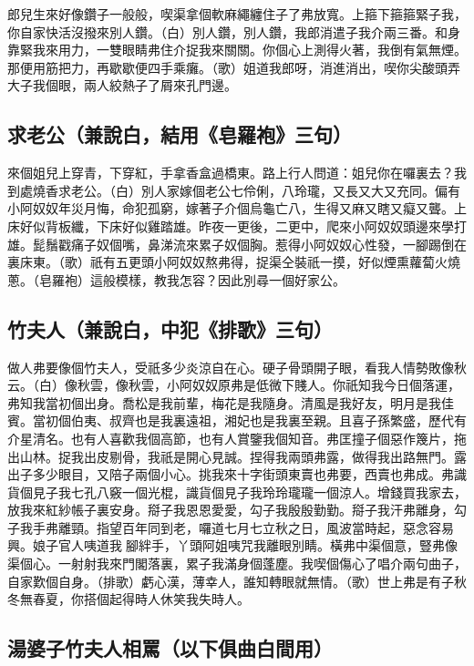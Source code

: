 郎兒生來好像鑽子一般般，喫渠拿個軟麻繩纏住子了弗放寬。上箍下箍箍緊子我，你自家快活沒撥來別人鑽。（白）別人鑽，別人鑽，我郎消遣子我介兩三番。和身靠緊我來用力，一雙眼睛弗住介捉我來關關。你個心上測得火著，我倒有氣無煙。那便用筋把力，再歇歇便四手乘癱。（歌）姐道我郎呀，消進消出，喫你尖酸頭弄大子我個眼，兩人絞熱子了屑來孔門邊。

\subsection*{求老公（兼說白，結用《皂羅袍》三句）}

來個姐兒上穿青，下穿紅，手拿香盒過橋東。路上行人問道：姐兒你在囉裏去？我到處燒香求老公。（白）別人家嫁個老公七伶俐，八玲瓏，又長又大又充同。偏有小阿奴奴年災月悔，命犯孤窮，嫁著子介個烏龜亡八，生得又麻又瞎又癡又聾。上床好似背板纖，下床好似雞踏雄。昨夜一更後，二更中，爬來小阿奴奴頭邊來學打雄。髭鬚戳痛子奴個嘴，鼻涕流來累子奴個胸。惹得小阿奴奴心性發，一腳踢倒在裏床東。（歌）祇有五更頭小阿奴奴熬弗得，捉渠仝裝祇一摸，好似煙熏蘿蔔火燒蔥。（皂羅袍）這般模樣，教我怎容？因此別尋一個好家公。

\subsection*{竹夫人（兼說白，中犯《排歌》三句）}

做人弗要像個竹夫人，受祇多少炎涼自在心。硬子骨頭開子眼，看我人情勢敗像秋云。（白）像秋雲，像秋雲，小阿奴奴原弗是低微下賤人。你祇知我今日個落運，弗知我當初個出身。喬松是我前輩，梅花是我隨身。清風是我好友，明月是我佳賓。當初個伯夷、叔齊也是我裏遠祖，湘妃也是我裏至親。且喜子孫繁盛，歷代有介星清名。也有人喜歡我個高節，也有人賞鑒我個知音。弗匡撞子個惡作篾片，拖出山林。捉我出皮剔骨，我祇是開心見誠。捏得我兩頭弗露，做得我出路無門。露出子多少眼目，又陪子兩個小心。挑我來十字街頭東賣也弗要，西賣也弗成。弗識貨個見子我七孔八竅一個光棍，識貨個見子我玲玲瓏瓏一個涼人。增錢買我家去，放我來紅紗帳子裏安身。搿子我恩恩愛愛，勾子我殷殷勤勤。搿子我汗弗離身，勾子我手弗離頸。指望百年同到老，囉道七月七立秋之日，風波當時起，惡念容易興。娘子官人咦道我𥕱腳絆手，丫頭阿姐咦咒我離眼別睛。橫弗中渠個意，豎弗像渠個心。一射射我來門閣落裏，累子我滿身個蓬塵。我喫個傷心了唱介兩句曲子，自家歎個自身。（排歌）虧心漢，薄幸人，誰知轉眼就無情。（歌）世上弗是有子秋冬無春夏，你搭個起得時人休笑我失時人。

\subsection*{湯婆子竹夫人相罵（以下俱曲白間用）}

